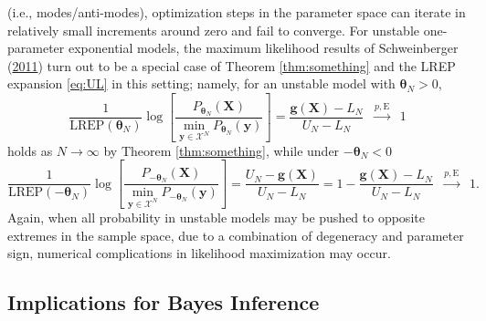 \documentclass[]{article}
\theoremstyle{definition}
\newcommand{\REP}{\mathrm{LREP}}
\begin{document}
(i.e., modes/anti-modes), optimization steps in the parameter space can
iterate in relatively small increments around zero and fail to converge.
For unstable one-parameter exponential models, the maximum likelihood
results of Schweinberger
(\protect\hyperlink{ref-schweinberger2011instability}{2011}) turn out to
be a special case of Theorem \ref{thm:something} and the LREP expansion
\eqref{eq:UL} in this setting; namely, for an unstable model with
\(\boldsymbol \theta_N>0\), \[
\frac{1}{\REP(\boldsymbol \theta_N)} \log\left[ \frac{P_{\boldsymbol \theta_N }(\boldsymbol X) }{\displaystyle{\min_{\boldsymbol y\in\mathcal{X}^N}} P_{\boldsymbol \theta_N }(\boldsymbol y)}\right] = \frac{\boldsymbol g(\boldsymbol X) - L_N}{U_N-L_N}\;\;\stackrel{p, \mathrm{E}}{\longrightarrow}\;\; 1
\] holds as \(N\to \infty\) by Theorem \ref{thm:something}, while under
\(-\boldsymbol \theta_N<0\) \[
\frac{1}{\REP(-\boldsymbol \theta_N)} \log\left[ \frac{P_{-\boldsymbol \theta_N }(\boldsymbol X) }{\displaystyle{\min_{\boldsymbol y\in\mathcal{X}^N}} P_{-\boldsymbol \theta_N }(\boldsymbol y)}\right] = \frac{U_N -\boldsymbol g(\boldsymbol X)}{U_N-L_N} = 1 - \frac{\boldsymbol g(\boldsymbol X) - L_N}{U_N-L_N} \;\;\stackrel{p, \mathrm{E}}{\longrightarrow}\;\; 1.
\] Again, when all probability in unstable models may be pushed to
opposite extremes in the sample space, due to a combination of
degeneracy and parameter sign, numerical complications in likelihood
maximization may occur.

\subsection{Implications for Bayes Inference}\label{bayes}
\end{document}
